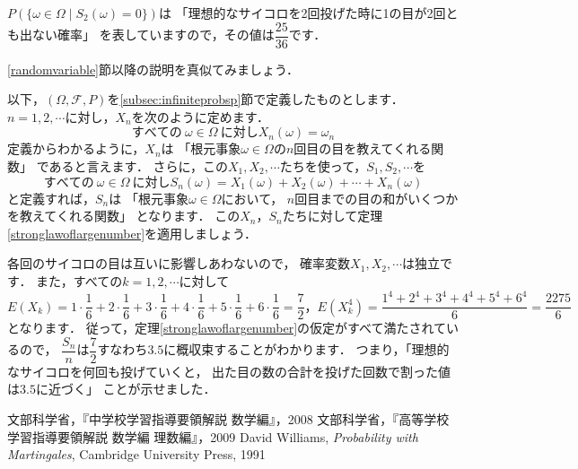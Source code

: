 \documentclass[./main]{subfiles} %
\theoremstyle{definition}
\begin{document}
$P(\{\omega\in\Omega\mid S_2(\omega)=0\})
$は
「理想的なサイコロを2回投げた時に1の目が2回とも出ない確率」
を表していますので，その値は$\dfrac{25}{36}$です．

\ref{randomvariable}節以降の説明を真似てみましょう．

以下，$(\Omega,\mathcal{F},P)$を\ref{subsec:infiniteprobsp}節で定義したものとします．
$n=1,2,\cdots$に対し，$X_n$を次のように定めます．
\[ すべての\ \omega\in\Omega\ に対しX_n(\omega)=\omega_n \]
定義からわかるように，$X_n$は
「根元事象$\omega\in\Omega$の$n$回目の目を教えてくれる関数」
であると言えます．
さらに，この$X_1,X_2,\cdots$たちを使って，$S_1,S_2,\cdots$を
\[ すべての\ \omega\in\Omega\ に対し
S_n(\omega)=X_1(\omega)+X_2(\omega)+\cdots+X_n(\omega) \]
と定義すれば，$S_n$は
「根元事象$\omega\in\Omega$において，
$n$回目までの目の和がいくつかを教えてくれる関数」
となります．
この$X_n$，$S_n$たちに対して定理\ref{stronglawoflargenumber}を適用しましょう．

各回のサイコロの目は互いに影響しあわないので，
確率変数$X_1,X_2,\cdots$は独立です．
また，すべての$k=1,2,\cdots$に対して
\[ E(X_k)=1\cdot\frac{1}{6}+2\cdot\frac{1}{6}
+3\cdot\frac{1}{6}+4\cdot\frac{1}{6}+5\cdot\frac{1}{6}
+6\cdot\frac{1}{6}=\frac{7}{2}，
E(X_k^4)=\frac{1^4+2^4+3^4+4^4+5^4+6^4}{6}=\frac{2275}{6} \]
となります．
従って，定理\ref{stronglawoflargenumber}の仮定がすべて満たされているので，
$\dfrac{S_n}{n}$は$\dfrac{7}{2}$すなわち$3.5$に概収束することがわかります．
つまり，「理想的なサイコロを何回も投げていくと，
出た目の数の合計を投げた回数で割った値は$3.5$に近づく」
ことが示せました．

\begin{thebibliography}{3}
文部科学省，『中学校学習指導要領解説 数学編』，2008
文部科学省，『高等学校学習指導要領解説 数学編 理数編』，2009
David Williams, \textit{Probability with Martingales}, Cambridge University Press, 1991
\end{thebibliography}

\end{document}
